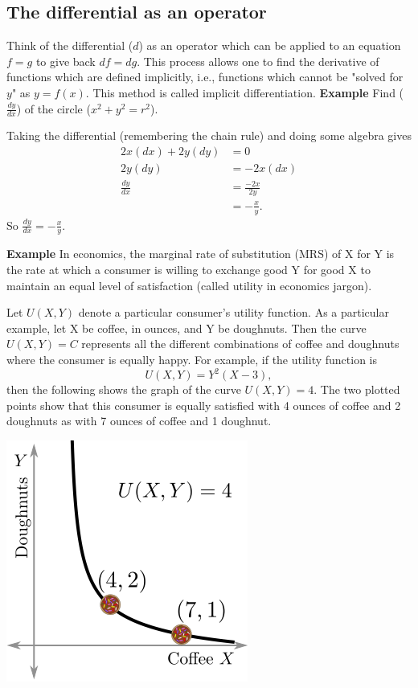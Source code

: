 \documentclass[twoside,openright,titlepage,a4paper]{book}
\begin{document}
\begin{sloppypar}
\subsection{The differential as an operator}

Think of the differential ($d$) as an operator which can be applied to an equation $f=g$ to give back $df = dg$. This process allows one to find the derivative of functions which are defined implicitly, i.e., functions which cannot be "solved for $y$" as $y=f(x)$. This method is called implicit differentiation.
\bigbreak
\textbf{Example} Find ($\frac{dy}{dx}$) of the circle ($x^2+y^2=r^2$).
\begin{examplebox}
Taking the differential (remembering the chain rule) and doing some algebra gives
\begin{align*}
2x(dx) + 2y(dy) &= 0 \\
2y(dy) &= -2x(dx) \\
\frac{dy}{dx} &= \frac{-2x}{2y} \\
&= -\frac{x}{y}.
\end{align*}
So $\frac{dy}{dx} = -\frac{x}{y}$.	
\end{examplebox}
\bigbreak
\textbf{Example} In economics, the marginal rate of substitution (MRS) of X for Y is the rate at which a consumer is willing to exchange good Y for good X to maintain an equal level of satisfaction (called utility in economics jargon).

Let $U(X,Y)$ denote a particular consumer's utility function. As a particular example, let X be coffee, in ounces, and Y be doughnuts. Then the curve $U(X,Y) = C$ represents all the different combinations of coffee and doughnuts where the consumer is equally happy. For example, if the utility function is \[ U(X,Y) = Y^2(X-3), \] then the following shows the graph of the curve $U(X,Y) = 4$. The two plotted points show that this consumer is equally satisfied with 4 ounces of coffee and 2 doughnuts as with 7 ounces of coffee and 1 doughnut.
\begin{center}\includegraphics[scale=0.6]{CoffeeDoughnuts}\end{center}	


\end{sloppypar}
\end{document}
